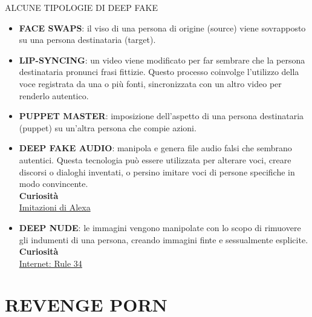 \documentclass[aspectratio=1610]{beamer}
\begin{document}
\begin{frame}{ALCUNE TIPOLOGIE DI DEEP FAKE}
    \begin{itemize}
        \justifying
        \item \textbf{FACE SWAPS}: il viso di una persona di origine (source) viene 
        sovrapposto su una persona destinataria (target).
        \pause
        \item \textbf{LIP-SYNCING}: un video viene modificato per far sembrare che la persona 
        destinataria pronunci frasi fittizie. Questo processo coinvolge l’utilizzo della voce 
        registrata da una o più fonti, sincronizzata con un altro video per renderlo autentico. 
        \pause
        \item \textbf{PUPPET MASTER}: imposizione dell’aspetto di una persona destinataria (puppet) 
        su un’altra persona che compie azioni.\\
        \pause
        \normalsize
        \item \textbf{DEEP FAKE AUDIO}: manipola e genera file audio falsi che sembrano autentici. 
        Questa tecnologia può essere utilizzata per alterare voci, creare discorsi o dialoghi inventati, 
        o persino imitare voci di persone specifiche in modo convincente.\\
        \tiny{\textbf{Curiosità}}\\
        \tiny{\href{https://www.wired.it/article/alexa-imita-voci-morti}{Imitazioni di Alexa}}\\
        \pause
        \normalsize
        \item \textbf{DEEP NUDE}: le immagini vengono manipolate con lo scopo di rimuovere 
        gli indumenti di una persona, creando immagini finte e sessualmente esplicite.\\
        \tiny{\textbf{Curiosità}}\\
        \tiny{\href{https://it.wikipedia.org/wiki/Regola_34}{Internet: Rule 34}}\\
        
    \end{itemize}
\end{frame}

\section{REVENGE PORN}
\end{document}
